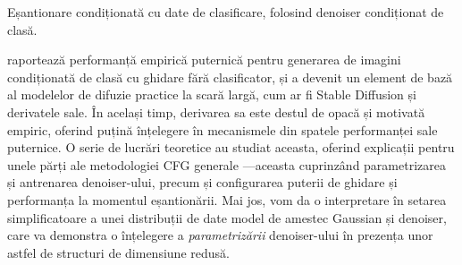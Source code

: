 \documentclass[../../book-main_ro.tex]{subfiles}
\begin{document}
\begin{algorithm}
  \caption{Eșantionare condiționată cu date de clasificare, folosind denoiser condiționat de clasă.}
	\label{alg:iterative_denoising_conditional_CFG}
	\begin{algorithmic}[1]
		 
		\EndFor
		\EndFunction
	\end{algorithmic}
\end{algorithm}

\textcite{Ho2022-ry} raportează performanță empirică puternică pentru generarea
de imagini condiționată de clasă cu ghidare fără clasificator, și a devenit un element de bază al
modelelor de difuzie practice la scară largă, cum ar fi Stable Diffusion
\cite{rombach2022high} și derivatele sale.
În același timp, derivarea sa este destul de opacă și motivată empiric,
oferind puțină înțelegere în mecanismele din spatele performanței sale puternice.
O serie de lucrări teoretice au studiat aceasta, oferind explicații pentru unele
părți ale metodologiei CFG generale
\cite{Bradley2024-jg,Li2025-li,Wu2024-js}---aceasta cuprinzând
parametrizarea și antrenarea denoiser-ului, precum și configurarea puterii de ghidare
și performanța la momentul eșantionării.
Mai jos, vom da o interpretare în setarea simplificatoare
a unei distribuții de date model de amestec Gaussian și denoiser, care va
demonstra o înțelegere a \textit{parametrizării} denoiser-ului în prezența
unor astfel de structuri de dimensiune redusă.
\end{document}
